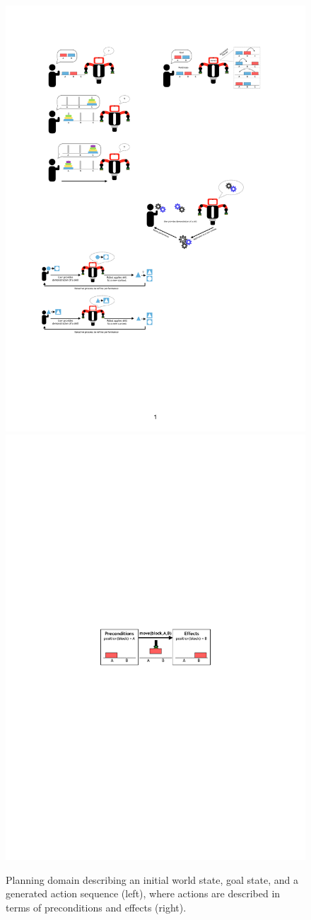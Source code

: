 \begin{figure}[htp]
	\centering
	\includegraphics[width=.55\linewidth]{figures/PbD-AutomatedPlanner}
	\includegraphics[width=.4\linewidth]{figures/schema-logic-1}
	\caption{Planning domain describing an initial world state, goal state, and a generated action sequence (left), where actions are described in terms of preconditions and effects (right).}
	\label{fig:Planning domain and action}
\end{figure}


\newpage
